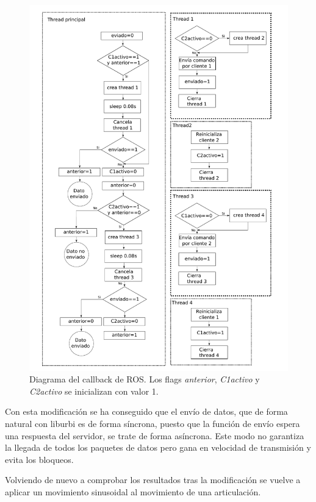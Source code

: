 \documentclass[12pt,a4paper,final,twoside]{article}
\begin{document}
\begin{figure}[H]
	\centering
    \includegraphics[scale=0.75]{images/esquemaCall.pdf}
	 \caption{Diagrama del callback de ROS. Los flags \textit{anterior}, \textit{C1activo} y \textit{C2activo} se inicializan con valor 1.}
  \label{fig:Call}
\end{figure}

Con esta modificación se ha conseguido que el envío de datos, que de forma natural con liburbi es de forma síncrona, puesto que la función de envío espera una respuesta del servidor, se trate de forma asíncrona. Este modo no garantiza la llegada de todos los paquetes de datos pero gana en velocidad de transmisión y evita los bloqueos.

Volviendo de nuevo a comprobar los resultados tras la modificación se vuelve a aplicar un movimiento sinusoidal al movimiento de una articulación.
\end{document}
